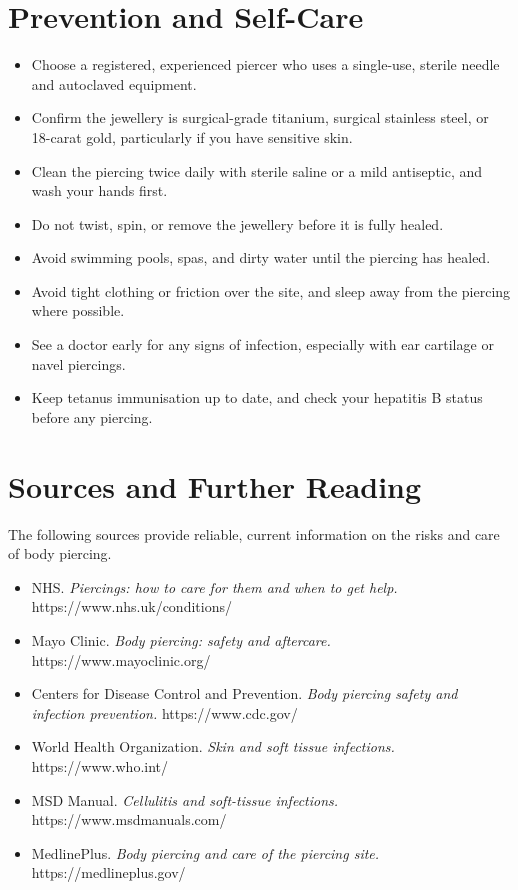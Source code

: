\section*{Prevention and Self-Care}
\begin{itemize}
    \item Choose a registered, experienced piercer who uses a single-use, sterile needle and autoclaved equipment.
    \item Confirm the jewellery is surgical-grade titanium, surgical stainless steel, or 18-carat gold, particularly if you have sensitive skin.
    \item Clean the piercing twice daily with sterile saline or a mild antiseptic, and wash your hands first.
    \item Do not twist, spin, or remove the jewellery before it is fully healed.
    \item Avoid swimming pools, spas, and dirty water until the piercing has healed.
    \item Avoid tight clothing or friction over the site, and sleep away from the piercing where possible.
    \item See a doctor early for any signs of infection, especially with ear cartilage or navel piercings.
    \item Keep tetanus immunisation up to date, and check your hepatitis B status before any piercing.
\end{itemize}

\section*{Sources and Further Reading}
The following sources provide reliable, current information on the risks and care of body piercing.
\begin{itemize}
    \item NHS. \textit{Piercings: how to care for them and when to get help.} https://www.nhs.uk/conditions/
    \item Mayo Clinic. \textit{Body piercing: safety and aftercare.} https://www.mayoclinic.org/
    \item Centers for Disease Control and Prevention. \textit{Body piercing safety and infection prevention.} https://www.cdc.gov/
    \item World Health Organization. \textit{Skin and soft tissue infections.} https://www.who.int/
    \item MSD Manual. \textit{Cellulitis and soft-tissue infections.} https://www.msdmanuals.com/
    \item MedlinePlus. \textit{Body piercing and care of the piercing site.} https://medlineplus.gov/
\end{itemize}
